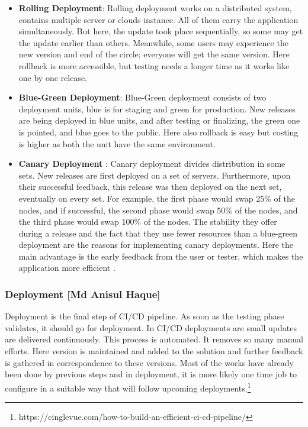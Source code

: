   
\begin{itemize}
    
\item \textbf{Rolling Deployment}: Rolling deployment works on a distributed system, contains multiple server or clouds instance. All of them carry the application simultaneously. But here, the update took place sequentially, so some may get the update earlier than others. Meanwhile, some users may experience the new version and end of the circle; everyone will get the same version. Here rollback is more accessible, but testing needs a longer time as it works like one by one release.
    
    
\item \textbf{Blue-Green Deployment}: Blue-Green deployment consists of two deployment units, blue is for staging and green for production. New releases are being deployed in blue units, and after testing or finalizing, the green one is pointed, and blue goes to the public. Here also rollback is easy but costing is higher as both the unit have the same environment.
     
    
\item \textbf{Canary Deployment} : Canary deployment divides distribution in some sets. New releases are first deployed on a set of servers. Furthermore, upon their successful feedback, this release was then deployed on the next set, eventually on every set. For example, the first phase would swap 25\% of the nodes, and if successful, the second phase would swap 50\% of the nodes, and the third phase would swap 100\% of the nodes. The stability they offer during a release and the fact that they use fewer resources than a blue-green deployment are the reasons for implementing canary deployments. Here the main advantage is the early feedback from the user or tester, which makes the application more efficient \cite{inproceedingsMunch}.
  
\end{itemize}


\subsubsection{Deployment [Md Anisul Haque]}

Deployment is the final step of CI/CD pipeline. As soon as the testing phase validates, it should go for deployment. In CI/CD deployments are small updates are delivered continuously. This process is automated. It removes so many manual efforts. Here version is maintained and added to the solution and further feedback is gathered in correspondence to these versions. Most of the works have already been done by previous steps and in deployment, it is more likely one time job to configure in a suitable way that will follow upcoming deployments.\footnote{https://cinglevue.com/how-to-build-an-efficient-ci-cd-pipeline/}


